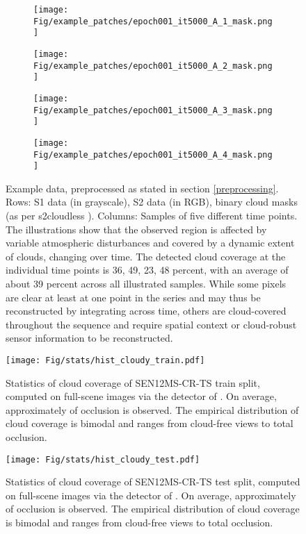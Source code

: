 \documentclass[journal]{IEEEtran}
\begin{document}
\begin{figure*}[h!tb]
\begin{subfigure}[b]{0.19\linewidth}
    \texttt{[image: Fig/example\_patches/epoch001\_it5000\_A\_1\_mask.png]}
  \end{subfigure}
    \begin{subfigure}[b]{0.19\linewidth}
    \texttt{[image: Fig/example\_patches/epoch001\_it5000\_A\_2\_mask.png]}
  \end{subfigure}
      \begin{subfigure}[b]{0.19\linewidth}
    \texttt{[image: Fig/example\_patches/epoch001\_it5000\_A\_3\_mask.png]}
  \end{subfigure}
      \begin{subfigure}[b]{0.19\linewidth}
    \texttt{[image: Fig/example\_patches/epoch001\_it5000\_A\_4\_mask.png]}
  \end{subfigure}
  \caption{Example data, preprocessed as stated in section \ref{preprocessing}. Rows: S1 data (in grayscale), S2 data (in RGB), binary cloud masks (as per s2cloudless \cite{Zupanc}). Columns: Samples of five different time points. The illustrations show that the observed region is affected by variable atmospheric disturbances and covered by a dynamic extent of clouds, changing over time. The detected cloud coverage at the individual time points is 36, 49, 23, 48 percent, with an average of about 39 percent across all illustrated samples. While some pixels are clear at least at one point in the series and may thus be reconstructed by integrating across time, others are cloud-covered throughout the sequence and require spatial context or cloud-robust sensor information to be reconstructed.
  }
  \label{fig:sample_patches_masks}
\end{figure*}

\begin{figure}[h!tb]
    \texttt{[image: Fig/stats/hist\_cloudy\_train.pdf]}
    \caption{Statistics of cloud coverage of SEN12MS-CR-TS train split, computed on full-scene images via the detector of \cite{Zupanc}. On average, approximately   of occlusion is observed. The empirical distribution of cloud coverage is bimodal and ranges from cloud-free views to total occlusion.}
    \label{fig:cloud_coverage_train}
\end{figure}

\begin{figure}[h!tb]
    \texttt{[image: Fig/stats/hist\_cloudy\_test.pdf]}
    \caption{Statistics of cloud coverage of SEN12MS-CR-TS test split, computed on full-scene images via the detector of \cite{Zupanc}. On average, approximately   of occlusion is observed. The empirical distribution of cloud coverage is bimodal and ranges from cloud-free views to total occlusion.}
    \label{fig:cloud_coverage_test}
\end{figure}
\end{document}
